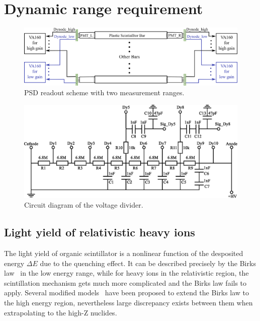 \documentclass[5p, times]{elsarticle}
\begin{document}
\section{Dynamic range requirement}
\label{sec:requirement}

\begin{figure}
\centering
 \includegraphics[width=140mm]{readout_scheme}
\caption{PSD readout scheme with two measurement ranges.}
\label{fig:readout_scheme}
\end{figure} 

\begin{figure}
\centering
 \includegraphics[width=130mm]{divider}
\caption{Circuit diagram of the voltage divider.}
\label{fig:divider}
\end{figure} 

\subsection{Light yield of relativistic heavy ions}
\label{sec:light_yield}
The light yield of organic scintillator is a nonlinear function of the desposited energy $\Delta E$ due to the quenching effect.
It can be described precisely by the Birks law~\cite{birks_theory_2013} in the low energy range, while for heavy ions in the relativistic region, the scintillation mechanism gets much more complicated and the Birks law fails to apply.
Several modified models~\cite{chou_nature_1952,tarle_cosmic_1979,menchaca-rocha_response_1999,matsufuji_response_1999} have been proposed to extend the Birks law to the high energy region, nevertheless large discrepancy exists between them when extrapolating to the high-Z nuclides.
\end{document}
